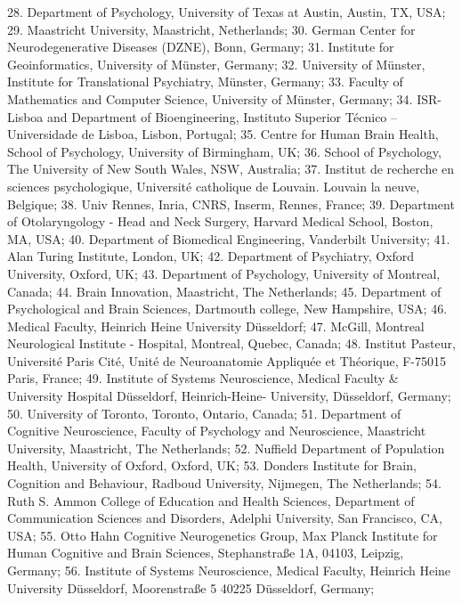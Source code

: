 \documentclass[10pt,a4paper,twocolumns]{proc}
\begin{document}
{28. Department of Psychology, University of Texas at Austin, Austin, TX, USA; %
29. Maastricht University, Maastricht, Netherlands; %
30. German Center for Neurodegenerative Diseases (DZNE), Bonn, Germany; %
31. Institute for Geoinformatics, University of Münster, Germany; %
32. University of Münster, Institute for Translational Psychiatry, Münster, Germany; %
33. Faculty of Mathematics and Computer Science, University of Münster, Germany; %
34. ISR-Lisboa and Department of Bioengineering, Instituto Superior Técnico – Universidade de Lisboa, Lisbon, Portugal; %
35. Centre for Human Brain Health, School of Psychology, University of Birmingham, UK; %
36. School of Psychology, The University of New South Wales, NSW, Australia; %
37. Institut de recherche en sciences psychologique, Université catholique de Louvain. Louvain la neuve, Belgique; %
38. Univ Rennes, Inria, CNRS, Inserm, Rennes, France; %
39. Department of Otolaryngology - Head and Neck Surgery, Harvard Medical School, Boston, MA, USA; %
40. Department of Biomedical Engineering, Vanderbilt University; %
41. Alan Turing Institute, London, UK; %
42. Department of Psychiatry, Oxford University, Oxford, UK; %
43. Department of Psychology, University of Montreal, Canada; %
44. Brain Innovation, Maastricht, The Netherlands; %
45. Department of Psychological and Brain Sciences, Dartmouth college, New Hampshire, USA; %
46. Medical Faculty, Heinrich Heine University Düsseldorf; %
47. McGill, Montreal Neurological Institute - Hospital, Montreal, Quebec, Canada; %
48. Institut Pasteur, Université Paris Cité, Unité de Neuroanatomie Appliquée et Théorique, F-75015 Paris, France; %
49. Institute of Systems Neuroscience, Medical Faculty & University Hospital Düsseldorf, Heinrich-Heine- University, Düsseldorf, Germany; %
50. University of Toronto, Toronto, Ontario, Canada; %
51. Department of Cognitive Neuroscience, Faculty of Psychology and Neuroscience, Maastricht University, Maastricht, The Netherlands; %
52. Nuffield Department of Population Health, University of Oxford, Oxford, UK; %
53. Donders Institute for Brain, Cognition and Behaviour, Radboud University, Nijmegen, The Netherlands; %
54. Ruth S. Ammon College of Education and Health Sciences, Department of Communication Sciences and Disorders, Adelphi University, San Francisco, CA, USA; %
55. Otto Hahn Cognitive Neurogenetics Group, Max Planck Institute for Human Cognitive and Brain Sciences, Stephanstraße 1A, 04103, Leipzig, Germany; %
56. Institute of Systems Neuroscience, Medical Faculty, Heinrich Heine University Düsseldorf, Moorenstraße 5 40225 Düsseldorf, Germany; %
}
\end{document}
